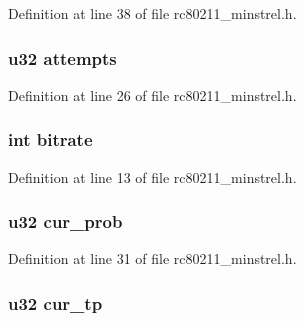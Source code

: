 Definition at line 38 of file rc80211\-\_\-minstrel.\-h.

\hypertarget{structminstrel__rate_ab31da70a28d3eb0519fe305d260a6f19}{
\subsubsection[{attempts}]{\setlength{\rightskip}{0pt plus 5cm}u32 attempts}}\label{structminstrel__rate_ab31da70a28d3eb0519fe305d260a6f19}


Definition at line 26 of file rc80211\-\_\-minstrel.\-h.

\hypertarget{structminstrel__rate_ab5d8e1788d02d0e52941a0778776e289}{
\subsubsection[{bitrate}]{\setlength{\rightskip}{0pt plus 5cm}int bitrate}}\label{structminstrel__rate_ab5d8e1788d02d0e52941a0778776e289}


Definition at line 13 of file rc80211\-\_\-minstrel.\-h.

\hypertarget{structminstrel__rate_a32b192e3ef506ee9c2a8168c37cebabc}{
\subsubsection[{cur\-\_\-prob}]{\setlength{\rightskip}{0pt plus 5cm}u32 cur\-\_\-prob}}\label{structminstrel__rate_a32b192e3ef506ee9c2a8168c37cebabc}


Definition at line 31 of file rc80211\-\_\-minstrel.\-h.

\hypertarget{structminstrel__rate_a0672074665762bee86be223a6f5a283e}{
\subsubsection[{cur\-\_\-tp}]{\setlength{\rightskip}{0pt plus 5cm}u32 cur\-\_\-tp}}\label{structminstrel__rate_a0672074665762bee86be223a6f5a283e}


